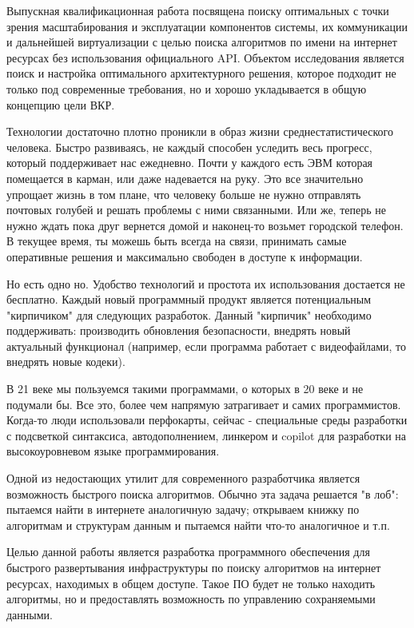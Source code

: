 \Introduction

Выпускная квалификационная работа посвящена поиску оптимальных с точки зрения
масштабирования и эксплуатации компонентов системы, их коммуникации и дальнейшей
виртуализации с целью поиска алгоритмов по имени на интернет ресурсах без
использования официального API. Объектом исследования является поиск и настройка
оптимального архитектурного решения, которое подходит не только под современные
требования, но и хорошо укладывается в общую концепцию цели ВКР.

Технологии достаточно плотно проникли в образ жизни среднестатистического
человека. Быстро развиваясь, не каждый способен уследить весь прогресс, который
поддерживает нас ежедневно. Почти у каждого есть ЭВМ которая помещается в
карман, или даже надевается на руку. Это все значительно упрощает жизнь в том
плане, что человеку больше не нужно отправлять почтовых голубей и решать
проблемы с ними связанными. Или же, теперь не нужно ждать пока друг вернется
домой и наконец-то возьмет городской телефон. В текущее время, ты можешь быть
всегда на связи, принимать самые оперативные решения и максимально свободен в
доступе к информации.

Но есть одно но. Удобство технологий и простота их использования достается не
бесплатно. Каждый новый программный продукт является потенциальным "кирпичиком"
для следующих разработок. Данный "кирпичик" необходимо поддерживать: производить
обновления безопасности, внедрять новый актуальный функционал (например, если
программа работает с видеофайлами, то внедрять новые кодеки).

В 21 веке мы пользуемся такими программами, о которых в 20 веке и не подумали
бы. Все это, более чем напрямую затрагивает и самих программистов. Когда-то люди
использовали перфокарты, сейчас - специальные среды разработки с подсветкой
синтаксиса, автодополнением, линкером и copilot для разработки на
высокоуровневом языке программирования.

Одной из недостающих утилит для современного разработчика является возможность
быстрого поиска алгоритмов. Обычно эта задача решается "в лоб": пытаемся найти в
интернете аналогичную задачу; открываем книжку по алгоритмам и структурам данным
и пытаемся найти что-то аналогичное и т.п.

Целью данной работы является разработка программного обеспечения для быстрого
развертывания инфраструктуры по поиску алгоритмов на интернет ресурсах,
находимых в общем доступе. Такое ПО будет не только находить алгоритмы, но и
предоставлять возможность по управлению сохраняемыми данными.

